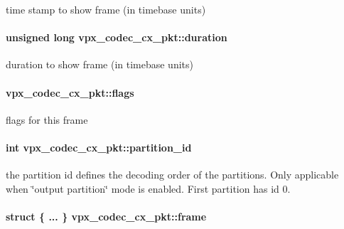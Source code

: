 time stamp to show frame (in timebase units) \hypertarget{structvpx__codec__cx__pkt_afb8d9069980e759d97d2eb9fae7e5e06}{
\paragraph[{duration}]{\setlength{\rightskip}{0pt plus 5cm}unsigned long vpx\+\_\+codec\+\_\+cx\+\_\+pkt\+::duration}}\label{structvpx__codec__cx__pkt_afb8d9069980e759d97d2eb9fae7e5e06}
duration to show frame (in timebase units) \hypertarget{structvpx__codec__cx__pkt_a3876fe0306342611465e9c15c6c4ae2f}{
\paragraph[{flags}]{ vpx\+\_\+codec\+\_\+cx\+\_\+pkt\+::flags}}\label{structvpx__codec__cx__pkt_a3876fe0306342611465e9c15c6c4ae2f}
flags for this frame \hypertarget{structvpx__codec__cx__pkt_aaffee6af93af238ca7a145fb56c6d6f7}{
\paragraph[{partition\+\_\+id}]{\setlength{\rightskip}{0pt plus 5cm}int vpx\+\_\+codec\+\_\+cx\+\_\+pkt\+::partition\+\_\+id}}\label{structvpx__codec__cx__pkt_aaffee6af93af238ca7a145fb56c6d6f7}
the partition id defines the decoding order of the partitions. Only applicable when \char`\"{}output partition\char`\"{} mode is enabled. First partition has id 0. \hypertarget{structvpx__codec__cx__pkt_a81e33bf4408a3983abb16492fee359ff}{
\paragraph[{frame}]{\setlength{\rightskip}{0pt plus 5cm}struct \{ ... \}   vpx\+\_\+codec\+\_\+cx\+\_\+pkt\+::frame}}\label{structvpx__codec__cx__pkt_a81e33bf4408a3983abb16492fee359ff}
